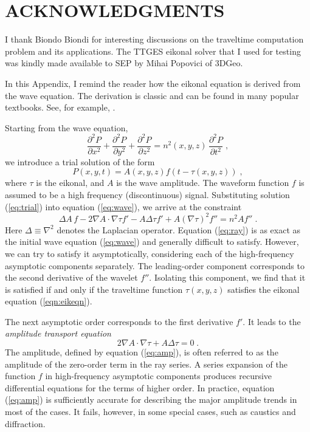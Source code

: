 \section{ACKNOWLEDGMENTS}
I thank Biondo Biondi for interesting discussions on the traveltime
computation problem and its applications. The TTGES eikonal solver
that I used for testing was kindly made available to SEP by Mihai
Popovici of 3DGeo.





In this Appendix, I remind the reader how the eikonal equation is
derived from the wave equation. The derivation is classic and can be
found in many popular textbooks. See, for example, \cite[]{cherv}.
\par
Starting from the wave equation,
\begin{equation}
  {\frac{\partial^2 P}{\partial x^2}} +
  {\frac{\partial^2 P}{\partial y^2}} +
  {\frac{\partial^2 P}{\partial z^2}} =
  {n^2 (x,y,z)\,\frac{\partial^2 P}{\partial t^2}}\;,
  \label{eq:wave}
\end{equation}
we introduce a trial solution of the form
\begin{equation}
  \label{eq:trial}
  P (x,y,t) = A (x,y,z) f (t - \tau (x,y,z))\;,
\end{equation}
where $\tau$ is the eikonal, and $A$ is the wave amplitude. The
waveform function $f$ is assumed to be a high frequency
(discontinuous) signal. Substituting solution (\ref{eq:trial}) into
equation (\ref{eq:wave}), we arrive at the constraint
\begin{equation}
  \label{eq:ray}
  \Delta A \, f - 2 \nabla A \cdot \nabla \tau f' -
  A \Delta \tau f '  + A \left(\nabla \tau\right)^2 f'' =
  n^2 A f''\;.
\end{equation}
Here $\Delta \equiv \nabla^2$ denotes the Laplacian operator.
Equation (\ref{eq:ray}) is as exact as the initial wave equation
(\ref{eq:wave}) and generally difficult to satisfy. However, we can
try to satisfy it asymptotically, considering each of the
high-frequency asymptotic components separately. The leading-order
component corresponds to the second derivative of the wavelet $f''$.
Isolating this component, we find that it is satisfied if and only if
the traveltime function $\tau (x,y,z)$ satisfies the eikonal equation
(\ref{eqn:eikeqn}).
\par
The next asymptotic order corresponds to the first derivative $f'$. It
leads to the \emph{amplitude transport equation}
\begin{equation}
  \label{eq:amp}
2 \nabla A \cdot \nabla \tau + A \Delta \tau = 0\;.
\end{equation}
The amplitude, defined by equation (\ref{eq:amp}), is often referred
to as the amplitude of the zero-order term in the ray series. A series
expansion of the function $f$ in high-frequency asymptotic components
produces recursive differential equations for the terms of higher
order. In practice, equation (\ref{eq:amp}) is sufficiently accurate
for describing the major amplitude trends in most of the cases. It
fails, however, in some special cases, such as caustics and diffraction.

